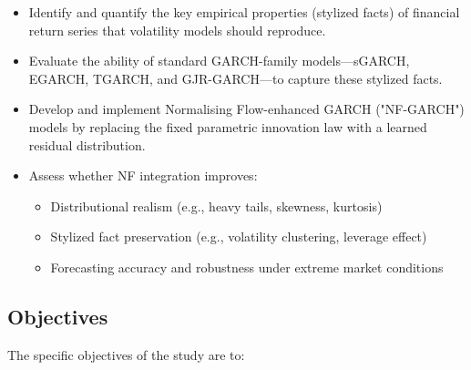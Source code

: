 \documentclass[oneside,12pt]{CUEDthesisPSnPDF}
\begin{document}
\begin{itemize}
    \item Identify and quantify the key empirical properties (stylized facts) of financial return series that volatility models should reproduce.
    \item Evaluate the ability of standard GARCH-family models—sGARCH, EGARCH, TGARCH, and GJR-GARCH—to capture these stylized facts.
    \item Develop and implement Normalising Flow-enhanced GARCH ("NF-GARCH") models by replacing the fixed parametric innovation law with a learned residual distribution.
    \item Assess whether NF integration improves:
    \begin{itemize}
        \item Distributional realism (e.g., heavy tails, skewness, kurtosis)
        \item Stylized fact preservation (e.g., volatility clustering, leverage effect)
        \item Forecasting accuracy and robustness under extreme market conditions
    \end{itemize}
\end{itemize}

\subsection{Objectives}
\noindent 
The specific objectives of the study are to:
\end{document}

